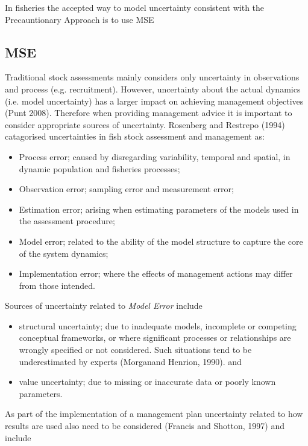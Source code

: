 \documentclass[a4paper,10pt]{article}
\begin{document}
In fisheries the accepted way to model uncertainty consistent with the Precauntionary Approach is to use MSE

\subsection*{MSE}
Traditional stock assessments mainly considers only uncertainty in observations and process (e.g. recruitment). 
However, uncertainty about the actual dynamics (i.e. model uncertainty) has a larger impact on achieving management objectives (Punt 2008). 
Therefore when providing management advice it is important to consider appropriate sources of uncertainty.  Rosenberg and Restrepo (1994) catagorised uncertainties in fish stock 
assessment and management as:

\begin{itemize}
 \item Process error; caused by disregarding variability, temporal and spatial, in dynamic population and fisheries processes;
 \item Observation error;  sampling error and measurement error;
 \item Estimation error; arising when estimating parameters of the models used in the assessment procedure;
 \item Model error; related to the ability of the model structure to capture the core of the system dynamics;
 \item Implementation error;  where the effects of management actions may differ from those intended.
\end{itemize}

Sources of uncertainty related to \emph{Model Error} include
    
\begin{itemize}
 \item structural uncertainty; due to inadequate models, incomplete or competing conceptual frameworks, or where significant processes or 
relationships are wrongly specified or not considered. Such situations tend to be underestimated by experts (Morganand Henrion, 1990). and
 \item value uncertainty; due to missing or inaccurate data or poorly known parameters.
\end{itemize}

As part of the implementation of a management plan uncertainty related to how results are used also need to be considered (Francis and Shotton, 1997) and 
include 
\end{document}
